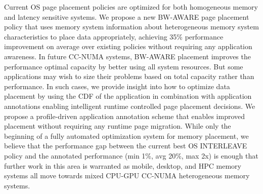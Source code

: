 Current OS page placement policies are optimized for both homogeneous memory and
latency sensitive systems.  We propose a new BW-AWARE page placement policy that
uses memory system information about heterogeneous memory system characteristics to place data
appropriately, achieving 35\% performance improvement on average over existing
policies without requiring any application awareness.  In future CC-NUMA
systems,
BW-AWARE placement improves the performance optimal capacity by better using
all system resources. But some applications may wish to size their problems
based on total capacity rather than performance. In such cases, we provide insight into
how to optimize data placement by using the CDF of the application in
combination with application annotations enabling intelligent runtime
controlled page placement decisions.  We propose a profile-driven application
annotation scheme that enables improved placement without requiring any
runtime page migration. While only the beginning of a fully automated
optimization system for memory placement, we believe that the performance gap between the current
best OS INTERLEAVE policy and the annotated performance (min 1\%, avg 20\%, max
2x) is enough that further work in this area is warranted as mobile, desktop,
and HPC memory systems all move towards mixed CPU-GPU CC-NUMA heterogeneous memory systems.
